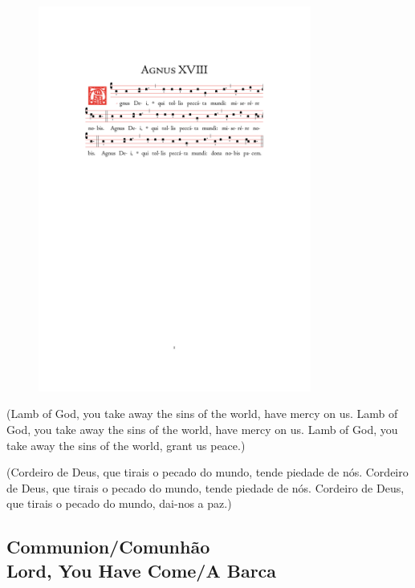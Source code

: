 \documentclass[10pt,a5]{article}
\begin{document}
\begin{figure}[h!]
	\centering
	\includegraphics[trim = 35mm 175mm 35.5mm 35mm, clip, width = 0.8\textwidth]{scores/Agnus-XVIII.pdf}
\end{figure}

\begin{paracol}{2}

(Lamb of God, you take away the sins of the world, have mercy on us.
Lamb of God, you take away the sins of the world, have mercy on us.
Lamb of God, you take away the sins of the world, grant us peace.)

\switchcolumn

(Cordeiro de Deus, que tirais o pecado do mundo, tende piedade de nós.
Cordeiro de Deus, que tirais o pecado do mundo, tende piedade de nós.
Cordeiro de Deus, que tirais o pecado do mundo, dai-nos a paz.)

\switchcolumn*

\end{paracol}

\begin{center}
\subsection*{Communion/Comunh\~ao \\ Lord, You Have Come/A Barca \ \ \ \ \ \ \ \ \ \ \ \ \ \ \ \ \   }
\end{center}
\end{document}
